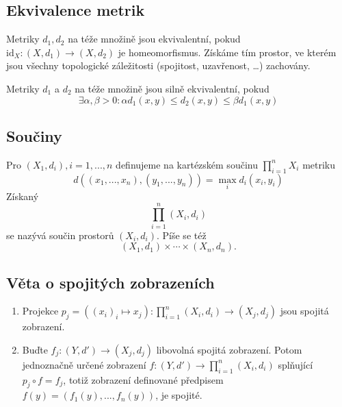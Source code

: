 \documentclass[../main.tex]{subfiles}
\begin{document}
\subsection{Ekvivalence metrik}

\begin{definition}
	Metriky $d_1, d_2$ na téže množině jsou ekvivalentní, pokud $\mathrm{id}_X : \left(X, d_1\right) \to (X, d_2)$ je homeomorfismus. Získáme tím prostor, ve kterém jsou všechny topologické záležitosti (spojitost, uzavřenost, \ldots) zachovány.
\end{definition}


\begin{definition}
	Metriky $d_1$ a $d_2$ na téže množině jsou silně ekvivalentní, pokud
	\[\exists \alpha , \beta > 0: \alpha d_1(x,y) \leq d_2(x,y) \leq \beta d_1(x,y)\]
\end{definition}

\subsection{Součiny}

\begin{definition}[Součin]
	Pro $(X_1,d_i), i = 1,...,n$ definujeme na kartézském součinu $\prod^n_{i=1}X_i$ metriku
	\[d((x_1,...,x_n),(y_1,...,y_n)) = \max_i d_i(x_i,y_i)\]
	Získaný
	\[\prod^n_{i=1}(X_i,d_i)\]
	se nazývá součin prostorů $(X_i, d_i)$. Píše se též 
	\[(X_1,d_1) \times \cdots \times (X_n,d_n).\]
\end{definition}

\subsection{Věta o spojitých zobrazeních}
\begin{theorem}
	\hfill
	\begin{enumerate}
	\item Projekce $p_j = ((x_i)_i \mapsto x_j) : \prod^n_{i=1}(X_i,d_i) \rightarrow (X_j,d_j)$ jsou spojitá zobrazení.
	
	\item Buďte $f_j:(Y,d') \rightarrow (X_j,d_j)$ libovolná spojitá zobrazení. Potom jednoznačně určené zobrazení 
	$f:(Y,d') \rightarrow \prod^n_{i=1}(X_i,d_i)$ splňující $p_j \circ f = f_j$, totiž zobrazení definované předpisem
	$f(y) = (f_1(y),...,f_n(y))$, je spojité.
	\end{enumerate}
\end{theorem}
\end{document}
